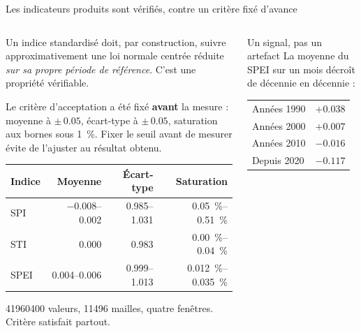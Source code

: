 \documentclass[aspectratio=169,11pt]{beamer}
\begin{document}
\begin{frame}{Les indicateurs produits sont vérifiés, contre un critère fixé d'avance}

\begin{columns}[T]
\begin{column}{0.56\textwidth}
\small
Un indice standardisé doit, par construction, suivre approximativement une loi normale centrée
réduite \emph{sur sa propre période de référence}. C'est une propriété vérifiable.

\vspace{0.3em}
Le critère d'acceptation a été fixé \textbf{avant} la mesure : moyenne à $\pm\,\num{0,05}$,
écart-type à $\pm\,\num{0,05}$, saturation aux bornes sous \SI{1}{\percent}. Fixer le seuil
avant de mesurer évite de l'ajuster au résultat obtenu.

\vspace{0.4em}
\footnotesize
\begin{tabularx}{\linewidth}{@{}Yrrr@{}}
\toprule
\textbf{Indice} & \textbf{Moyenne} & \textbf{Écart-type} & \textbf{Saturation} \\
\midrule
SPI  & \numrange{-0,008}{0,002} & \numrange{0,985}{1,031} & \SIrange{0,05}{0,51}{\percent} \\
STI  & \num{0,000}              & \num{0,983}             & \SIrange{0,00}{0,04}{\percent} \\
SPEI & \numrange{0,004}{0,006}  & \numrange{0,999}{1,013} & \SIrange{0,012}{0,035}{\percent} \\
\bottomrule
\end{tabularx}

\vspace{0.3em}
{\footnotesize \num{41960400} valeurs, \num{11496} mailles, quatre fenêtres. Critère satisfait
partout.\par}
\end{column}

\begin{column}{0.40\textwidth}
\small
\begin{apport}{Un signal, pas un artefact}
La moyenne du SPEI sur un mois décroît de décennie en décennie :
\end{apport}

\vspace{0.2em}
\footnotesize
\begin{center}
\begin{tabular}{@{}lr@{}}
\toprule
Années 1990 & $+\num{0,038}$ \\
Années 2000 & $+\num{0,007}$ \\
Années 2010 & $-\num{0,016}$ \\
Depuis 2020 & $-\num{0,117}$ \\
\bottomrule
\end{tabular}
\end{center}


\end{column}
\end{columns}
\end{frame}
\end{document}

